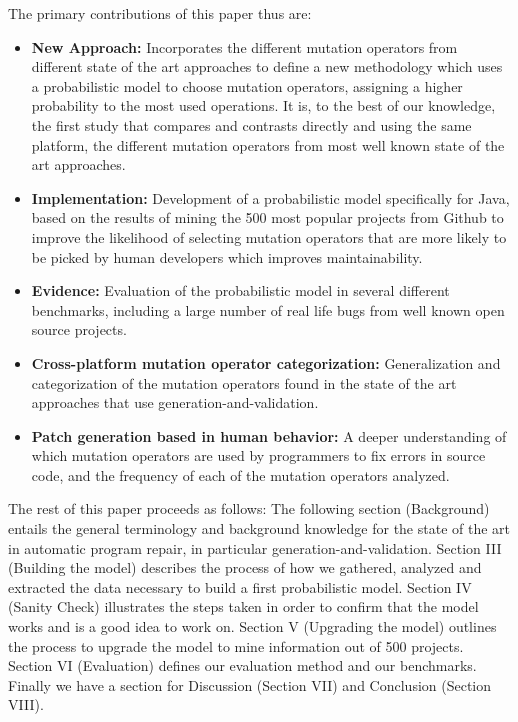 \documentclass[conference]{IEEEtran}
\begin{document}
The primary contributions of this paper thus are:
\begin{itemize}
  \item \textbf{New Approach:} Incorporates the different mutation operators from different state of the art approaches to define a new methodology which uses a probabilistic model to choose mutation operators, assigning a higher probability to the most used operations. It is, to the best of our knowledge, the first study that compares and contrasts directly and using the same platform, the different mutation operators from most well known state of the art approaches. 
  \item \textbf{Implementation:} Development of a probabilistic model specifically for Java, based on the results of mining the 500 most popular projects from Github to improve the likelihood of selecting mutation operators that are more likely to be picked by human developers which improves maintainability.
  \item \textbf{Evidence:} Evaluation of the probabilistic model in several different benchmarks, including a large number of real life bugs from well known open source projects.
  \item \textbf{Cross-platform mutation operator categorization:} Generalization and categorization of the mutation operators found in the state of the art approaches that use generation-and-validation.
  \item \textbf{Patch generation based in human behavior:} A deeper understanding of which mutation operators are used by programmers to fix errors in source code, and the frequency of each of the mutation operators analyzed.  
\end{itemize}

The rest of this paper proceeds as follows:
The following section (Background) entails the general terminology and background knowledge for the state of the art in automatic program repair, in particular generation-and-validation. Section III (Building the model) describes the process of how we gathered, analyzed and extracted the data necessary to build a first probabilistic model. Section IV (Sanity Check) illustrates the steps taken in order to confirm that the model works and is a good idea to work on. Section V (Upgrading the model) outlines the process to upgrade the model to mine information out of 500 projects. Section VI (Evaluation) defines our evaluation method and our benchmarks. Finally we have a section for Discussion (Section VII) and Conclusion (Section VIII).
\end{document}
